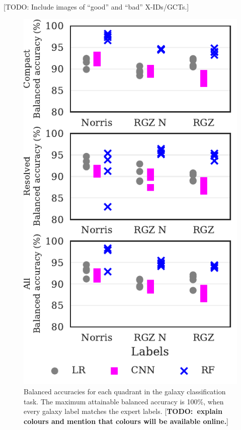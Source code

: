 \documentclass[fleqn,usenatbib,usedcolumn]{mnras}
\newcommand{\todo}[1]{ {\color{red}[{\bf TODO:~{#1}}]} }
\begin{document}
  {[}TODO: Include images of ``good'' and ``bad'' X-IDs/GCTs.{]}
  \begin{figure}
  \centering
  \includegraphics[width=\columnwidth]{images/cdfs_ba_grid.pdf}
  \caption{Balanced accuracies for each quadrant in the galaxy
    classification task. The maximum attainable balanced accuracy is 100\%, when
    every galaxy label matches the expert labels. \todo{explain colours and
    mention that colours will be available online.}\label{fig:ba}}
  \end{figure}
\end{document}
